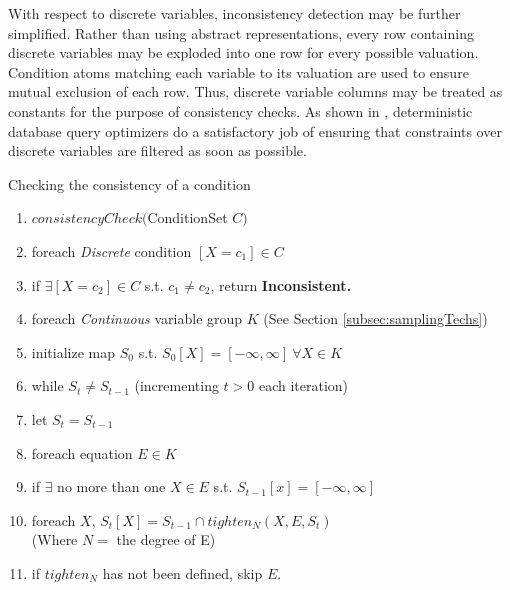 With  respect to discrete variables, inconsistency detection may be further simplified.  Rather than using abstract representations, every row containing discrete variables may be exploded into one row for every possible valuation.  Condition atoms matching each variable to its valuation are used to ensure mutual exclusion of each row.  Thus, discrete variable columns may be treated as constants for the purpose of consistency checks.  As shown in \cite{AJKO2008}, deterministic database query optimizers do a satisfactory job of ensuring that constraints over discrete variables are filtered as soon as possible.

\vspace*{0.05in}
\begin{algorithm} Checking the consistency of a condition
\footnotesize
\begin{enumerate}
\item $consistencyCheck($ConditionSet $C)$
\item \hspace*{0.1in} foreach \textit{Discrete} condition $[X = c_1] \in C$
\item \hspace*{0.2in} if $\exists [X = c_2] \in C$ s.t. $c_1 \neq c_2$, return \textbf{Inconsistent.}
\item \hspace*{0.1in} foreach \textit{Continuous} variable group $K$ (See Section \ref{subsec:samplingTechs})
\item \hspace*{0.2in} initialize map $S_0$ s.t. $S_0[X] = [-\infty,\infty]\ \forall X \in K$
\item \hspace*{0.2in} while $S_{t} \neq S_{t-1}$ (incrementing $t>0$ each iteration)
\item \hspace*{0.3in} let $S_{t} = S_{t-1}$
\item \hspace*{0.3in} foreach equation $E \in K$
\item \hspace*{0.4in} if $\exists$ no more than one $X\in E$ s.t. $S_{t-1}[x] = [-\infty,\infty]$
\item \hspace*{0.5in} foreach $X$, $S_{t}[X] = S_{t-1} \cap tighten_N(X,E,S_{t})$\\ \hspace*{0.7in} (Where $N = $ the degree of E)
\item \hspace*{0.5in} if $tighten_N$ has not been defined, skip $E$.

\end{enumerate}
\end{algorithm}
